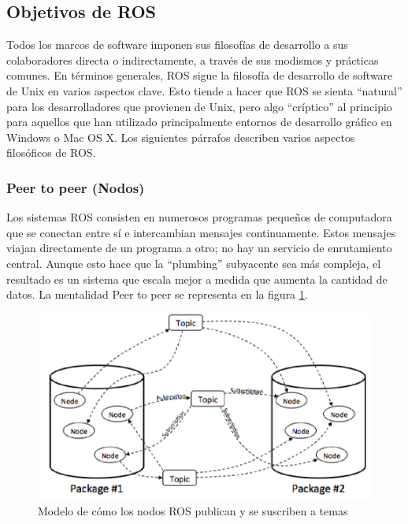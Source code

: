     \newpage

        
    \subsection{Objetivos de ROS}
    
        Todos los marcos de software imponen sus filosofías de desarrollo a sus colaboradores directa o indirectamente, a través de sus modismos y prácticas comunes. En términos generales, ROS sigue la filosofía de desarrollo de software de Unix en varios aspectos clave. Esto tiende a hacer que ROS se sienta ``natural'' para los desarrolladores que provienen de Unix, pero algo ``críptico'' al principio para aquellos que han utilizado principalmente entornos de desarrollo gráfico en Windows o Mac OS X. Los siguientes párrafos describen varios aspectos filosóficos de ROS.
        
        \subsubsection{Peer to peer (Nodos)}
        
            Los sistemas ROS consisten en numerosos programas pequeños de computadora que se conectan entre sí e intercambian mensajes continuamente. Estos mensajes viajan directamente de un programa a otro; no hay un servicio de enrutamiento central. Aunque esto hace que la ``plumbing'' subyacente sea más compleja, el resultado es un sistema que escala mejor a medida que aumenta la cantidad de datos. La mentalidad Peer to peer se representa en la figura \ref{f:Cap3-5_arquitectura_ros}.
            
            \begin{figure}[htb]
                \centering
                \includegraphics[width=0.8\linewidth]{Main/Chapter3/Images3/arquitectura_por_nodos_1.png}
                \caption{Modelo de cómo los nodos ROS publican y se suscriben a temas \cite{naval_delta}}
                \label{f:Cap3-5_arquitectura_ros}
            \end{figure}
            
